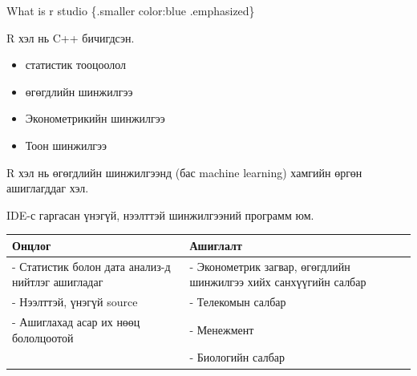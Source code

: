 \documentclass[
  ignorenonframetext,
]{beamer}
\providecommand{\tightlist}{%
  \setlength{\itemsep}{0pt}\setlength{\parskip}{0pt}}
\begin{document}
\begin{frame}{What is r studio \{.smaller color:blue .emphasized\}}
\protect\hypertarget{what-is-r-studio-.smaller-colorblue-.emphasized}{}

R хэл нь C++ бичигдсэн.

\begin{itemize}
\tightlist
\item
  статистик тооцоолол
\item
  өгөгдлийн шинжилгээ
\item
  Эконометрикийн шинжилгээ
\item
  Тоон шинжилгээ
\end{itemize}

R хэл нь өгөгдлийн шинжилгээнд (бас machine learning) хамгийн өргөн
ашиглагддаг хэл.

IDE-с гаргасан үнэгүй, нээлттэй шинжилгээний программ юм.

\begin{longtable}[]{@{}ll@{}}
\toprule
\begin{minipage}[b]{0.60\columnwidth}\raggedright
Онцлог\strut
\end{minipage} & \begin{minipage}[b]{0.34\columnwidth}\raggedright
Ашиглалт\strut
\end{minipage}\tabularnewline
\midrule
\endhead
\begin{minipage}[t]{0.60\columnwidth}\raggedright
- Статистик болон дата анализ-д нийтлэг ашигладаг\strut
\end{minipage} & \begin{minipage}[t]{0.34\columnwidth}\raggedright
- Эконометрик загвар, өгөгдлийн шинжилгээ хийх санхүүгийн салбар\strut
\end{minipage}\tabularnewline
\begin{minipage}[t]{0.60\columnwidth}\raggedright
- Нээлттэй, үнэгүй source\strut
\end{minipage} & \begin{minipage}[t]{0.34\columnwidth}\raggedright
- Телекомын салбар\strut
\end{minipage}\tabularnewline
\begin{minipage}[t]{0.60\columnwidth}\raggedright
- Ашиглахад асар их нөөц бололцоотой\strut
\end{minipage} & \begin{minipage}[t]{0.34\columnwidth}\raggedright
- Менежмент\strut
\end{minipage}\tabularnewline
\begin{minipage}[t]{0.60\columnwidth}\raggedright
\strut
\end{minipage} & \begin{minipage}[t]{0.34\columnwidth}\raggedright
- Биологийн салбар\strut
\end{minipage}\tabularnewline
\bottomrule
\end{longtable}

\end{frame}
\end{document}
